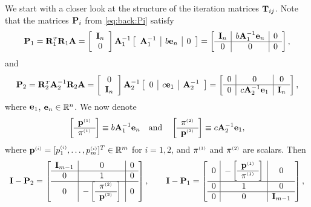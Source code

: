 We start with a closer look at the structure of the iteration matrices
$\T_{ij}$. Note that the matrices $\P_i$ from \eqref{eq:back:Pi} satisfy
%
\begin{equation}\label{eq:1D:P1struct}
\P_1 = \R_1^{\Tr}\R_1\A
=\left[\begin{array}{c} \I_{n}\\ 0\end{array}\right]\A_1^{-1}
\left[\begin{array}{c|c|c}\A_1^{-1} & \entryzE \e_n & 0\end{array}\right]=
\left[\begin{array}{c|c|c}\I_{n}&\entryzE \A_1^{-1}\e_{n}&0\\\hline 0&0&0\end{array}\right],
\end{equation}
%
and
%
\begin{equation}\label{eq:1D:P2struct}
\P_2 = \R_2^{\Tr}\A_2^{-1}\R_2\A =
\left[\begin{array}{c} 0 \\  \I_n\end{array}\right] \A_2^{-1}
\left[\begin{array}{c|c|c}0 & \entryzW \e_1 & \A_2^{-1} \end{array}\right]=
\left[\begin{array}{c|c|c}0&0&0\\\hline0&\entryzW \A_2^{-1}\e_1 & \I_{n}\end{array}\right],
\end{equation}
%
where $\e_1$, $\e_n\in \mathbb{R}^n$. We now denote
%
\begin{equation}\label{eq:1D:p_and_pi}
\left[\begin{array}{c}\pOne \\\hline \piOne\end{array}\right]
\equiv \entryzE\A_1^{-1}\e_n\quad\mbox{and}\quad
\left[\begin{array}{c} \piTwo\\\hline \pTwo\end{array}\right]
\equiv \entryzW\A_2^{-1}\e_1,
\end{equation}
%
where $\pII=[\pI_1,\dots,\pI_m]^T\in{\mathbb R}^m$ for $i=1,2$, and $\piOne$
and $\piTwo$ are scalars. Then
%
$$\I - \P_2  =
\left[\begin{array}{c|c|c}\I_{m-1}&0&0\\\hline
0&1&0\\\hline 0&-\left[\begin{array}{c} \piTwo\\\hline \pTwo\end{array}\right]&0\end{array}\right],\qquad
\I - \P_1  =
\left[\begin{array}{c|c|c}0&-\left[\begin{array}{c}\pOne \\\hline \piOne\end{array}\right]&0\\\hline 0&1&0\\\hline 0&0&\I_{m-1}\end{array}\right],$$
